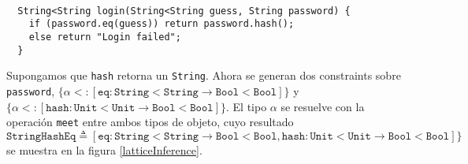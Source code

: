\begin{ej} \ \\
  \normalfont
  \label{ej2-5}
\begin{lstlisting}
  String<String login(String<String guess, String password) {
  	if (password.eq(guess)) return password.hash();
  	else return "Login failed";
  }
\end{lstlisting}
\end{ej}

Supongamos que \texttt{hash} retorna un \texttt{String}. Ahora se generan dos constraints sobre \texttt{password}, $\{\alpha <: [\mathtt{eq} : \mathtt{String<String} \rightarrow \mathtt{Bool<Bool}]\}$ y $\{\alpha <: [\mathtt{hash} : \mathtt{Unit<Unit} \rightarrow \mathtt{Bool<Bool}]\}$. El tipo $\alpha$ se resuelve con la operación \texttt{meet} entre ambos tipos de objeto, cuyo resultado $\mathtt{StringHashEq} \triangleq [\mathtt{eq} : \mathtt{String<String} \rightarrow \mathtt{Bool<Bool}, \mathtt{hash} : \mathtt{Unit<Unit} \rightarrow \mathtt{Bool<Bool}]\}$ se muestra en la figura \ref{latticeInference}.
